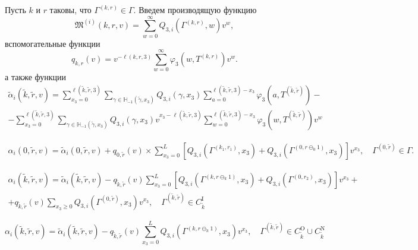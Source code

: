 \documentclass[a4paper,12pt,russian]{extarticle}
\begin{document}
Пусть $k$ и $r$ таковы, что $\Gamma^{(k,r)}\in \Gamma$. Введем производящую функцию
\begin{equation*}
\mathfrak{M}^{(i)}(k,r,v) = \sum_{w=0}^{\infty} Q_{3,i}(\Gamma^{(k,r)},w) v^w,
\end{equation*}
вспомогательные функции
\begin{equation*}
q_{k,r}(v) = v^{-\ell(k,r,3)}\sum_{w=0}^{\infty} \varphi_3(w,T^{(k,r)})v^w.
\end{equation*}
а также функции
\begin{multline}
\tilde{\alpha}_i(\tilde{k},\tilde{r},v) = \sum_{x_3=0}^{\ell(\tilde{k},\tilde{r},3)}\sum_{\gamma \in {\mathbb H}_{-1}(\tilde{\gamma},x_3)} Q_{3,i}(\gamma,x_3) \sum_{a=0}^{\ell(\tilde{k},\tilde{r},3) - x_3} \varphi_3(a,T^{(\tilde{k},\tilde{r})}) - \\
- \sum_{x_3=0}^{\ell(\tilde{k},\tilde{r},3)}  \sum_{\gamma \in {\mathbb H}_{-1}(\tilde{\gamma},x_3)} Q_{3,i}(\gamma,x_3) v^{x_3-\ell(\tilde{k},\tilde{r},3)}  \sum_{w=0}^{\ell(\tilde{k},\tilde{r},3) -x_3}
\varphi_3(w,T^{(\tilde{k},\tilde{r})}) v^w
\end{multline}

\begin{multline}
\alpha_i(0,\tilde{r},v) =\tilde{\alpha}_i(0,\tilde{r},v) + q_{0,\tilde{r}}(v) \times \sum_{x_3=0}^{L} \left[ Q_{3,i}(\Gamma^{(k_1,r_1)},x_3) + Q_{3,i}(\Gamma^{(0,r\ominus_0 1)},x_3) \right] v^{x_3}, \quad \Gamma^{(0,\tilde{r})} \in \Gamma.
\end{multline}

\begin{multline}
\alpha_i(\tilde{k},\tilde{r},v) =\tilde{\alpha}_i(\tilde{k},\tilde{r},v) - q_{\tilde{k},\tilde{r}}(v)\sum_{x_3=0}^{L} \left[ Q_{3,i}(\Gamma^{(k,r\ominus_k 1)},x_3) + Q_{3,i}(\Gamma^{(0,r_2)},x_3) \right] v^{x_3}+ \\ 
+ q_{\tilde{k},\tilde{r}}(v)  \sum_{x_3\geqslant 0} Q_{3,i}(\Gamma^{(0,\tilde{r})},x_3) v^{x_3}, \quad \Gamma^{(\tilde{k}, \tilde{r})} \in C_{\tilde{k}}^{\mathrm{I}}
\end{multline}

\begin{equation}
\alpha_i(\tilde{k},\tilde{r},v) =\tilde{\alpha}_i(\tilde{k},\tilde{r},v) - q_{\tilde{k},\tilde{r}}(v) \sum_{x_3=0}^{L} Q_{3,i}(\Gamma^{(k,r\ominus_k 1)},x_3) v^{x_3} , \quad \Gamma^{(\tilde{k}, \tilde{r})} \in C_{\tilde{k}}^{\mathrm{O}} \cup C_{\tilde{k}}^{\mathrm{N}}
\end{equation}
\end{document}
